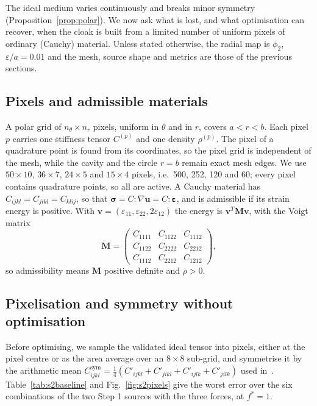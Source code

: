\documentclass[preprint,12pt]{elsarticle}
\newcommand{\mbf}[1]{\mathbf{#1}}
\newcommand{\be}{\begin{equation}}
\newcommand{\ee}{\end{equation}}
\newcommand{\bsigma}{\boldsymbol{\sigma}}
\begin{document}
The ideal medium varies continuously and breaks minor symmetry (Proposition~\ref{prop:polar}). We now ask what is lost,
and what optimisation can recover, when the cloak is built from a limited number of uniform pixels of ordinary
(Cauchy) material. Unless stated otherwise, the radial map is $\phi_2$, $\varepsilon/a=0.01$ and the mesh, source shape and
metrics are those of the previous sections.

\subsection{Pixels and admissible materials}

A polar grid of $n_\theta\times n_r$ pixels, uniform in $\theta$ and in $r$, covers $a<r<b$. Each pixel $p$ carries one
stiffness tensor $C^{(p)}$ and one density $\rho^{(p)}$. The pixel of a quadrature point is found from its coordinates, so the
pixel grid is independent of the mesh, while the cavity and the circle $r=b$ remain exact mesh edges. We use $50\times10$,
$36\times7$, $24\times5$ and $15\times4$ pixels, i.e.\ 500, 252, 120 and 60; every pixel contains quadrature points, so all are
active. A Cauchy material has $C_{ijkl}=C_{jikl}=C_{klij}$, so that $\bsigma=C:\nabla\mbf{u}=C:\boldsymbol{\varepsilon}$, and is
admissible if its strain energy is positive. With $\mbf{v}=(\varepsilon_{11},\varepsilon_{22},2\varepsilon_{12})$ the energy is
$\mbf{v}^T\mbf{M}\mbf{v}$, with the Voigt matrix
\be\label{eq:voigt}
\mbf{M}=\begin{pmatrix}C_{1111}&C_{1122}&C_{1112}\\C_{1122}&C_{2222}&C_{2212}\\C_{1112}&C_{2212}&C_{1212}\end{pmatrix},
\ee
so admissibility means $\mbf{M}$ positive definite and $\rho>0$.

\subsection{Pixelisation and symmetry without optimisation}

Before optimising, we sample the validated ideal tensor into pixels, either at the pixel centre or as the area average over
an $8\times8$ sub-grid, and symmetrise it by the arithmetic mean
$C^{\mathrm{sym}}_{ijkl}=\frac14(C'_{ijkl}+C'_{jikl}+C'_{ijlk}+C'_{jilk})$ used in~\citet{chatzopoulos2023}. Table~\ref{tab:s2baseline}
and Fig.~\ref{fig:s2pixels} give the worst error over the six combinations of the two Step 1 sources with the three forces,
at $f^*=1$.
\end{document}
